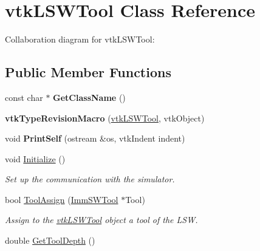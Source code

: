 \hypertarget{classvtkLSWTool}{
\section{vtkLSWTool Class Reference}
\label{classvtkLSWTool}
}
Collaboration diagram for vtkLSWTool:\subsection*{Public Member Functions}
\begin{DoxyCompactItemize}
\item 
\hypertarget{classvtkLSWTool_afab41086fa44ac93e499e53a22c29162}{
const char $\ast$ {\bfseries GetClassName} ()}
\label{classvtkLSWTool_afab41086fa44ac93e499e53a22c29162}

\item 
\hypertarget{classvtkLSWTool_a241c593d9b4c2726a7a726b25072dd56}{
{\bfseries vtkTypeRevisionMacro} (\hyperlink{classvtkLSWTool}{vtkLSWTool}, vtkObject)}
\label{classvtkLSWTool_a241c593d9b4c2726a7a726b25072dd56}

\item 
\hypertarget{classvtkLSWTool_a95800852b3a3b524969977fa8701bb49}{
void {\bfseries PrintSelf} (ostream \&os, vtkIndent indent)}
\label{classvtkLSWTool_a95800852b3a3b524969977fa8701bb49}

\item 
\hypertarget{classvtkLSWTool_ac0e55b5f343ed54e7f8df04740ad6600}{
void \hyperlink{classvtkLSWTool_ac0e55b5f343ed54e7f8df04740ad6600}{Initialize} ()}
\label{classvtkLSWTool_ac0e55b5f343ed54e7f8df04740ad6600}

\begin{DoxyCompactList}\small\item\em Set up the communication with the simulator. \item\end{DoxyCompactList}\item 
\hypertarget{classvtkLSWTool_ac361f9c3adbf02cfe98f648f52ee04df}{
bool \hyperlink{classvtkLSWTool_ac361f9c3adbf02cfe98f648f52ee04df}{ToolAssign} (\hyperlink{classImmSWTool}{ImmSWTool} $\ast$Tool)}
\label{classvtkLSWTool_ac361f9c3adbf02cfe98f648f52ee04df}

\begin{DoxyCompactList}\small\item\em Assign to the \hyperlink{classvtkLSWTool}{vtkLSWTool} object a tool of the LSW. \item\end{DoxyCompactList}\item 
\hypertarget{classvtkLSWTool_a1210f50d89cc4e596cd3ac1a190bc6b0}{
double \hyperlink{classvtkLSWTool_a1210f50d89cc4e596cd3ac1a190bc6b0}{GetToolDepth} ()}
\label{classvtkLSWTool_a1210f50d89cc4e596cd3ac1a190bc6b0}


\end{DoxyCompactItemize}
